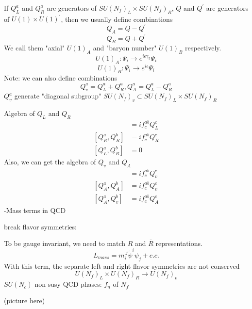 \documentclass[type = bachelor]{fduthesis-en}
\begin{document}
If $Q^a_L$ and $Q^a_R$ are generators of $SU(N_f)_L\times SU(N_f)_R$, $Q$ and $Q^\prime$ are generators of $U(1)\times U(1)^\prime$, then we usually define combinations
\begin{equation}
Q_A=Q-Q^\prime
\end{equation}
\begin{equation}
Q_B=Q+Q^\prime
\end{equation}
We call them "axial" $U(1)_A$ and "baryon number" $U(1)_B$ respectively.
\begin{equation}
U(1)_A: \Psi_i \rightarrow e^{i\epsilon\gamma_5}\Psi_i
\end{equation}
\begin{equation}
U(1)_B: \Psi_i \rightarrow e^{i\epsilon}\Psi_i
\end{equation}
Note: we can also define combinations
\begin{equation}
Q_v^a=Q_L^a+Q_R^a, Q_A^a=Q_L^a-Q_R^a
\end{equation}
$Q_v^a$ generate "diagonal subgroup" $SU(N_f)_v\subset SU(N_f)_L\times SU(N_f)_R$

Algebra of $Q_L$ and $Q_R$
\begin{align}
[Q_L^a,Q_L^b]&=if^{ab}_cQ^c_L\\
[Q_R^a,Q_R^b]&=if^{ab}_cQ^c_R\\
[Q_L^a,Q_R^b]&=0
\end{align}
Also, we can get the algebra of $Q_v$ and $Q_A$
\begin{align}
[Q_v^a,Q_v^b]&=if^{ab}_cQ_v^c\\
[Q_A^a,Q_A^b]&=if^{ab}_cQ_v^c\\
[Q_A^a,Q_v^b]&=if^{ab}_cQ_A^c
\end{align}
-Mass terms in QCD

break flavor symmetries:

To be gauge invariant, we need to match $R$ and $\bar{R}$ representations.
\begin{equation}
L_{mass}=m_i^{\ j}\tilde{\psi}^i\psi_j+c.c.
\end{equation}
With this term, the separate left and right flavor symmetries are not conserved
\begin{equation}
U(N_f)_L\times U(N_f)_R\rightarrow U(N_f)_v
\end{equation}
$SU(N_c)$ non-susy QCD phases: $f_n$ of $N_f$

(picture here)
\end{document}
